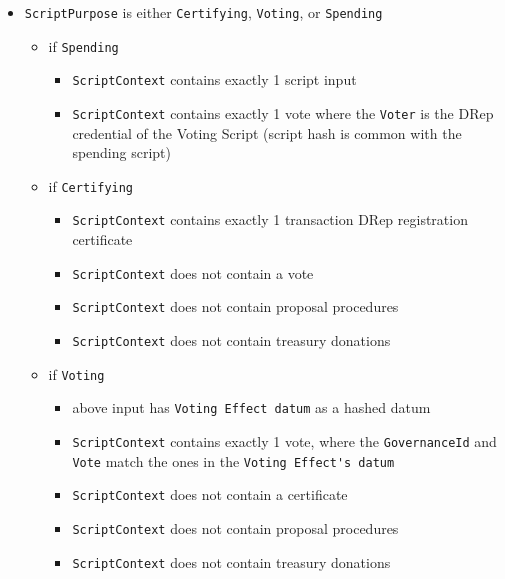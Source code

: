 \documentclass{article}
\begin{document}
\begin{itemize}
  \item \verb|ScriptPurpose| is either \verb|Certifying|, \verb|Voting|, or \verb|Spending|
        \begin{itemize}
          \item if \verb|Spending|
                \begin {itemize}

          \item \verb|ScriptContext| contains exactly 1 script input
          \item \verb|ScriptContext| contains exactly 1 vote where the \verb|Voter| is the DRep credential of the Voting Script (script hash is common with the spending script)
        \end{itemize}
  \item if \verb|Certifying|
        \begin{itemize}
          \item \verb|ScriptContext| contains exactly 1 transaction DRep registration certificate
          \item \verb|ScriptContext| does not contain a vote
          \item \verb|ScriptContext| does not contain proposal procedures
          \item \verb|ScriptContext| does not contain treasury donations
        \end{itemize}
  \item if \verb|Voting|
        \begin{itemize}
          \item above input has \verb|Voting Effect datum| as a hashed datum
          \item \verb|ScriptContext| contains exactly 1 vote, where the \verb|GovernanceId| and \verb|Vote| match the ones in the \verb|Voting Effect's datum|
          \item \verb|ScriptContext| does not contain a certificate
          \item \verb|ScriptContext| does not contain proposal procedures
          \item \verb|ScriptContext| does not contain treasury donations
        \end{itemize}


\end{itemize}
\end{itemize}
\end{document}
